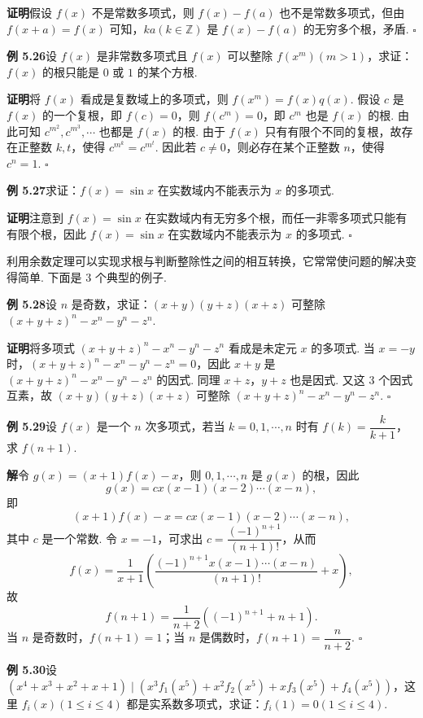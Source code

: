 \documentclass[UTF8, 12pt, fontset=fandol, oneside]{ctexart}
\begin{document}
\noindent\textbf{证明}\quad 假设 $f(x)$ 不是常数多项式，则 $f(x)-f(a)$ 也不是常数多项式，但由 $f(x+a)=f(x)$ 可知，$ka(k\in\mathbb{Z})$ 是 $f(x)-f(a)$ 的无穷多个根，矛盾. \hfill $\square$

\noindent\textbf{例 5.26}\quad 设 $f(x)$ 是非常数多项式且 $f(x)$ 可以整除 $f(x^m)(m>1)$，求证：$f(x)$ 的根只能是 $0$ 或 $1$ 的某个方根.

\noindent\textbf{证明}\quad 将 $f(x)$ 看成是复数域上的多项式，则 $f(x^m)=f(x)q(x)$. 假设 $c$ 是 $f(x)$ 的一个复根，即 $f(c)=0$，则 $f(c^m)=0$，即 $c^m$ 也是 $f(x)$ 的根. 由此可知 $c^{m^2},c^{m^3},\cdots$ 也都是 $f(x)$ 的根. 由于 $f(x)$ 只有有限个不同的复根，故存在正整数 $k,t$，使得 $c^{m^k}=c^{m^t}$. 因此若 $c\ne0$，则必存在某个正整数 $n$，使得 $c^n=1$. \hfill $\square$

\noindent\textbf{例 5.27}\quad 求证：$f(x)=\sin x$ 在实数域内不能表示为 $x$ 的多项式.

\noindent\textbf{证明}\quad 注意到 $f(x)=\sin x$ 在实数域内有无穷多个根，而任一非零多项式只能有有限个根，因此 $f(x)=\sin x$ 在实数域内不能表示为 $x$ 的多项式. \hfill $\square$

利用余数定理可以实现求根与判断整除性之间的相互转换，它常常使问题的解决变得简单. 下面是 3 个典型的例子.

\noindent\textbf{例 5.28}\quad 设 $n$ 是奇数，求证：$(x+y)(y+z)(x+z)$ 可整除 $(x+y+z)^n-x^n-y^n-z^n$.

\noindent\textbf{证明}\quad 将多项式 $(x+y+z)^n-x^n-y^n-z^n$ 看成是未定元 $x$ 的多项式. 当 $x=-y$ 时，$(x+y+z)^n-x^n-y^n-z^n=0$，因此 $x+y$ 是 $(x+y+z)^n-x^n-y^n-z^n$ 的因式. 同理 $x+z$，$y+z$ 也是因式. 又这 3 个因式互素，故 $(x+y)(y+z)(x+z)$ 可整除 $(x+y+z)^n-x^n-y^n-z^n$. \hfill $\square$

\noindent\textbf{例 5.29}\quad 设 $f(x)$ 是一个 $n$ 次多项式，若当 $k=0,1,\cdots,n$ 时有 $f(k)=\dfrac{k}{k+1}$，求 $f(n+1)$.

\noindent\textbf{解}\quad 令 $g(x)=(x+1)f(x)-x$，则 $0,1,\cdots,n$ 是 $g(x)$ 的根，因此
\[
g(x)=cx(x-1)(x-2)\cdots(x-n),
\]
即
\[
(x+1)f(x)-x=cx(x-1)(x-2)\cdots(x-n),
\]
其中 $c$ 是一个常数. 令 $x=-1$，可求出 $c=\dfrac{(-1)^{n+1}}{(n+1)!}$，从而
\[
f(x)=\frac{1}{x+1}\left(\frac{(-1)^{n+1}x(x-1)\cdots(x-n)}{(n+1)!}+x\right),
\]
故
\[
f(n+1)=\frac{1}{n+2}\left((-1)^{n+1}+n+1\right).
\]
当 $n$ 是奇数时，$f(n+1)=1$；当 $n$ 是偶数时，$f(n+1)=\dfrac{n}{n+2}$. \hfill $\square$

\noindent\textbf{例 5.30}\quad 设 $(x^4+x^3+x^2+x+1)\mid (x^3f_1(x^5)+x^2f_2(x^5)+xf_3(x^5)+f_4(x^5))$，这里 $f_i(x)(1\le i\le4)$ 都是实系数多项式，求证：$f_i(1)=0(1\le i\le4)$.
\end{document}
